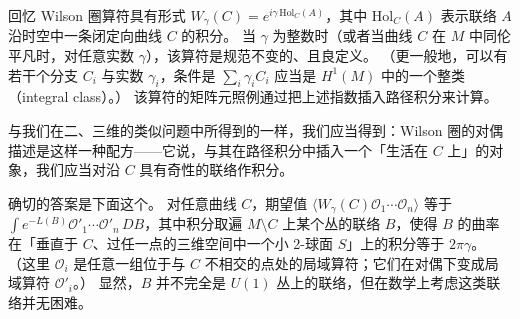 

回忆 Wilson 圈算符具有形式 $W_\gamma(C)=e^{i\gamma\,\mathrm{Hol}_C(A)}$，其中 $\mathrm{Hol}_C(A)$ 表示联络 $A$ 沿时空中一条闭定向曲线 $C$ 的积分。
当 $\gamma$ 为整数时（或者当曲线 $C$ 在 $M$ 中同伦平凡时，对任意实数 $\gamma$），该算符是规范不变的、且良定义。
（更一般地，可以有若干个分支 $C_i$ 与实数 $\gamma_i$，条件是 $\sum_i\gamma_iC_i$ 应当是 $H^1(M)$ 中的一个整类（integral class）。）
该算符的矩阵元照例通过把上述指数插入路径积分来计算。

与我们在二、三维的类似问题中所得到的一样，我们应当得到：Wilson 圈的对偶描述是这样一种配方——它说，与其在路径积分中插入一个「生活在 $C$ 上」的对象，我们应当对沿 $C$ 具有奇性的联络作积分。

确切的答案是下面这个。
对任意曲线 $C$，期望值 $\langle W_\gamma(C)\mathcal{O}_1\cdots\mathcal{O}_n\rangle$ 等于 $\int e^{-L(B)}\mathcal{O}'_1\cdots\mathcal{O}'_n\,DB$，其中积分取遍 $M\setminus C$ 上某个丛的联络 $B$，使得 $B$ 的曲率在「垂直于 $C$、过任一点的三维空间中一个小 2-球面 $S$」上的积分等于 $2\pi\gamma$。
（这里 $\mathcal{O}_i$ 是任意一组位于与 $C$ 不相交的点处的局域算符；它们在对偶下变成局域算符 $\mathcal{O}'_i$。）
显然，$B$ 并不完全是 $U(1)$ 丛上的联络，但在数学上考虑这类联络并无困难。

